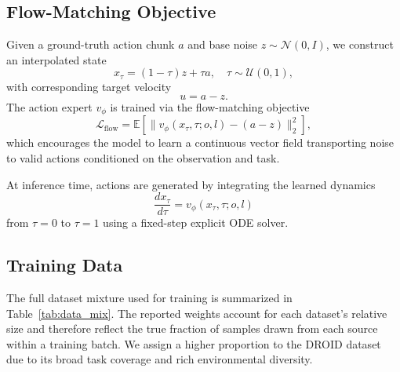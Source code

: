 \subsection{Flow-Matching Objective}
Given a ground-truth action chunk $a$ and base noise $z \sim \mathcal{N}(0,I)$, we construct an interpolated state
\[
x_\tau = (1-\tau)z + \tau a, \quad \tau \sim \mathcal{U}(0,1),
\]
with corresponding target velocity
\[
u = a - z .
\]
The action expert $v_\phi$ is trained via the flow-matching objective
\[
\mathcal{L}_{\text{flow}} =
\mathbb{E}\!\left[
\big\| v_\phi(x_\tau,\tau; o, l) - (a - z) \big\|_2^2
\right],
\]
which encourages the model to learn a continuous vector field transporting noise to valid actions conditioned on the observation and task.

At inference time, actions are generated by integrating the learned dynamics
\[
\frac{dx_\tau}{d\tau} = v_\phi(x_\tau,\tau; o, l)
\]
from $\tau=0$ to $\tau=1$ using a fixed-step explicit ODE solver.


\subsection{Training Data} 
The full dataset mixture used for training is summarized in Table~\ref{tab:data_mix}. The reported weights account for each dataset’s relative size and therefore reflect the true fraction of samples drawn from each source within a training batch. We assign a higher proportion to the DROID dataset~\cite{khazatsky2025droidlargescaleinthewildrobot} due to its broad task coverage and rich environmental diversity.

